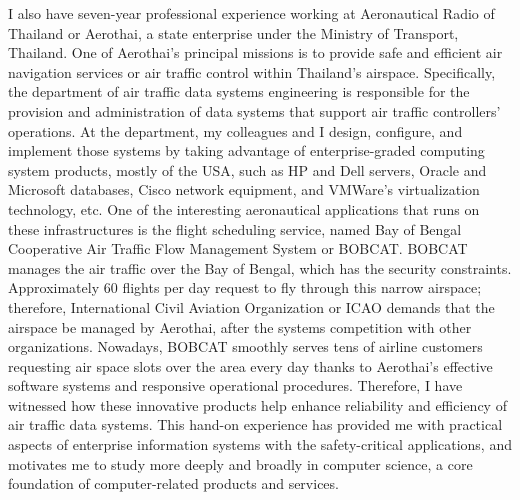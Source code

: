 \documentclass[a4paper,10pt]{report}
\begin{document}
\vspace{0.2cm}
I also have seven-year professional experience working at Aeronautical Radio of Thailand or Aerothai, a state enterprise under the Ministry of Transport, Thailand. One of Aerothai's principal missions is to provide safe and efficient air navigation services or air traffic control within Thailand's airspace. Specifically, the department of air traffic data systems engineering is responsible for the provision and administration of data systems that support air traffic controllers' operations. At the department, my colleagues and I design, configure, and implement those systems by taking advantage of enterprise-graded computing system products, mostly of the USA, such as HP and Dell servers, Oracle and Microsoft databases, Cisco network equipment, and VMWare's virtualization technology, etc. One of the interesting aeronautical applications that runs on these infrastructures is the flight scheduling service, named Bay of Bengal Cooperative Air Traffic Flow Management System or BOBCAT. BOBCAT manages the air traffic over the Bay of Bengal, which has the security constraints. Approximately 60 flights per day request to fly through this narrow airspace; therefore, International Civil Aviation Organization or ICAO demands that the airspace be managed by Aerothai, after the systems competition with other organizations. Nowadays, BOBCAT smoothly serves tens of airline customers requesting air space slots over the area every day thanks to Aerothai's effective software systems and responsive operational procedures.  Therefore, I have witnessed how these innovative products help enhance reliability and efficiency of air traffic data systems. This hand-on experience has provided me with practical aspects of enterprise information systems with the safety-critical applications, and motivates me to study more deeply and broadly in computer science, a core foundation of computer-related products and services. 
\end{document}
